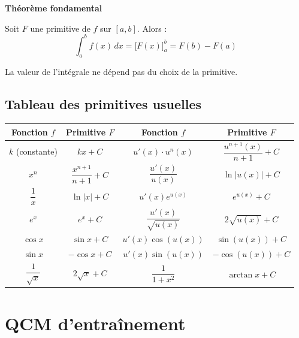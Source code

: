 \documentclass[../PolyS2.tex]{subfiles}
\begin{document}
\begin{Thm}\textbf{Théorème fondamental}

Soit $F$ une primitive de $f$ sur $[a,b]$. Alors :
$$\int_a^b f(x) \, dx = \big[F(x)\big]_a^b = F(b) - F(a)$$

La valeur de l'intégrale ne dépend pas du choix de la primitive.
\end{Thm}

\subsection{Tableau des primitives usuelles}

\renewcommand{\arraystretch}{2.0}
\begin{center}
\begin{tabular}{|c|c||c|c|}
\hline
\textbf{Fonction $f$} & \textbf{Primitive $F$} & \textbf{Fonction $f$} & \textbf{Primitive $F$} \\
\hline
$k$ (constante) & $kx + C$ & $u'(x) \cdot u^n(x)$ & $\dfrac{u^{n+1}(x)}{n+1} + C$ \\
\hline
$x^n$ & $\dfrac{x^{n+1}}{n+1} + C$ & $\dfrac{u'(x)}{u(x)}$ & $\ln |u(x)| + C$ \\
\hline
$\dfrac{1}{x}$ & $\ln |x| + C$ & $u'(x) e^{u(x)}$ & $e^{u(x)} + C$ \\
\hline
$e^x$ & $e^x + C$ & $\dfrac{u'(x)}{\sqrt{u(x)}}$ & $2\sqrt{u(x)} + C$ \\
\hline
$\cos x$ & $\sin x + C$ & $u'(x) \cos(u(x))$ & $\sin(u(x)) + C$ \\
\hline
$\sin x$ & $-\cos x + C$ & $u'(x) \sin(u(x))$ & $-\cos(u(x)) + C$ \\
\hline
$\dfrac{1}{\sqrt{x}}$ & $2\sqrt{x} + C$ & $\dfrac{1}{1+x^2}$ & $\arctan x + C$ \\
\hline
\end{tabular}
\end{center}



\section{QCM d'entraînement}

\end{document}
